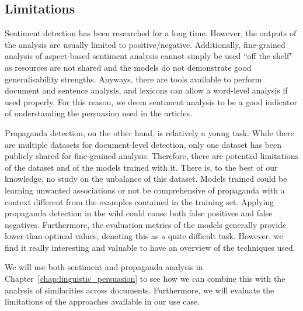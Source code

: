 \subsection{\statusgreen Limitations}

Sentiment detection has been researched for a long time.
However, the outputs of the analysis are usually limited to positive/negative.
Additionally, fine-grained analysis of aspect-based sentiment analysis cannot simply be used ``off the shelf" as resources are not shared and the models do not demonstrate good generalisability strengths.
Anyways, there are tools available to perform document and sentence analysis, and lexicons can allow a word-level analysis if used properly. For this reason, we deem sentiment analysis to be a good indicator of understanding the persuasion used in the articles.

Propaganda detection, on the other hand, is relatively a young task.
While there are multiple datasets for document-level detection, only one dataset has been publicly shared for fine-grained analysis.
Therefore, there are potential limitations of the dataset and of the models trained with it.
There is, to the best of our knowledge, no study on the unbalance of this dataset. Models trained could be learning unwanted associations or not be comprehensive of propaganda with a context different from the examples contained in the training set.
Applying propaganda detection in the wild could cause both false positives and false negatives.
Furthermore, the evaluation metrics of the models generally provide lower-than-optimal values, denoting  this as a quite difficult task.
However, we find it really interesting and valuable to have an overview of the techniques used.

We will use both sentiment and propaganda analysis in Chapter~\ref{chap:linguistic_persuasion} to see how we can combine this with the analysis of similarities across documents.
Furthermore, we will evaluate the limitations of the approaches available in our use case.

